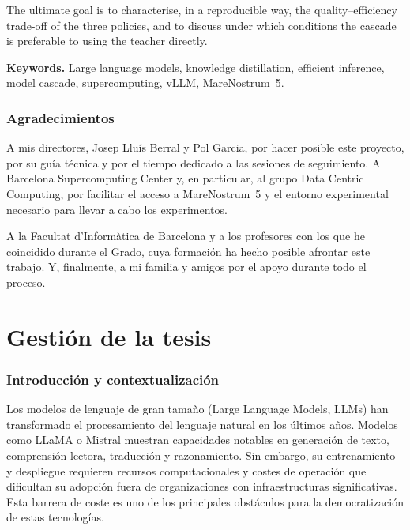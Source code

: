 \documentclass[11pt,a4paper]{article}
\begin{document}
The ultimate goal is to characterise, in a reproducible way, the quality--efficiency trade-off of the three policies, and to discuss under which conditions the cascade is preferable to using the teacher directly.

\textbf{Keywords.} Large language models, knowledge distillation, efficient inference, model cascade, supercomputing, vLLM, MareNostrum~5.

\newpage
\section*{Agradecimientos}

A mis directores, Josep Lluís Berral y Pol Garcia, por hacer posible este proyecto, por su guía técnica y por el tiempo dedicado a las sesiones de seguimiento. Al Barcelona Supercomputing Center y, en particular, al grupo Data Centric Computing, por facilitar el acceso a MareNostrum~5 y el entorno experimental necesario para llevar a cabo los experimentos.

A la Facultat d'Informàtica de Barcelona y a los profesores con los que he coincidido durante el Grado, cuya formación ha hecho posible afrontar este trabajo. Y, finalmente, a mi familia y amigos por el apoyo durante todo el proceso.

\newpage
\tableofcontents
\newpage
\listoftables
\newpage
\listoffigures
\newpage

\small

\part{Gestión de la tesis}
\label{part:gestion-tesis}

\section{Introducción y contextualización}

Los modelos de lenguaje de gran tamaño (Large Language Models, LLMs) han transformado el procesamiento del lenguaje natural en los últimos años. Modelos como LLaMA o Mistral muestran capacidades notables en generación de texto, comprensión lectora, traducción y razonamiento. Sin embargo, su entrenamiento y despliegue requieren recursos computacionales y costes de operación que dificultan su adopción fuera de organizaciones con infraestructuras significativas. Esta barrera de coste es uno de los principales obstáculos para la democratización de estas tecnologías.
\end{document}
